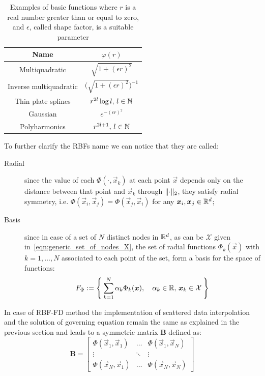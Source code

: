 \begin{table}
	\caption{Examples of basic functions where $r$ is a real number greater than or equal to zero, and $\epsilon$, called shape factor, is a suitable parameter}
	\label{tab:basic_functions}
	\centering
	\begin{tabular}{cc}
		\toprule
		Name										&  $\varphi(r)$																	\\
		\midrule
		Multiquadratic					 			&  $\sqrt{1+(\epsilon r)^2}$													\\
		Inverse multiquadratic	 					&  $\big(  \sqrt{1 + (\epsilon r)^2}  \big)^{-1}$  								\\
		Thin plate splines			   				&  $r^{2l} \log l, \, l\in\mathbb{N}$													\\
		Gaussian							    	&  $e^{- (\epsilon r)^2}$												  		\\
		Polyharmonics								&  $r^{2l + 1}, \, l\in\mathbb{N}$														\\
		\bottomrule
	\end{tabular}
\end{table}

To further clarify the RBFs name we can notice that they are called:
\begin{description}
	\item[Radial] since the value of each $\Phi(\cdot, \vec{x}_k)$ at each point $\vec{x}$ depends only on the distance between that point and $\vec{x}_k$ through $\lVert\cdot\rVert_2$, they satisfy radial symmetry, i.e. $\Phi(\vec{x}_i, \vec{x}_j) = \Phi(\vec{x}_j, \vec{x}_i)$ for any $\boldsymbol{x}_i, \boldsymbol{x}_j \in \mathbb{R}^d$;
	\item[Basis] since in case of a set of $N$ distinct nodes in $\mathbb{R}^d$, as can be $\mathcal{X}$ given in~\eqref{eqn:generic_set_of_nodes_X}, the set of radial functions $\Phi_k{(\vec{x})}$ with $k=1, \dots, N$ associated to each point of the set, form a basis for the space of functions:
	\[
	F_{\Phi} := \Set{ \sum_{k=1}^{N} \alpha_k \Phi_k{(\boldsymbol{x})},  \quad \alpha_k \in\mathbb{R}, \, \boldsymbol{x}_k \in \mathcal{X}}
	\]
\end{description}

In case of RBF-FD method the implementation of scattered data interpolation and the solution of governing equation remain the same as explained in the previous section and leads to a symmetric matrix $\boldsymbol{B}$ defined as:
\begin{equation}
	\boldsymbol{B} =
	\begin{bmatrix}
		\Phi(\vec{x}_1, \vec{x}_1)  & 	\dots 	& 	\Phi(\vec{x}_1, \vec{x}_N)  \\
		\vdots											& \ddots &  \vdots											  \\
		\Phi(\vec{x}_N, \vec{x}_1)  & 	\dots 	& 	\Phi(\vec{x}_N, \vec{x}_N)
	\end{bmatrix}
\end{equation}

